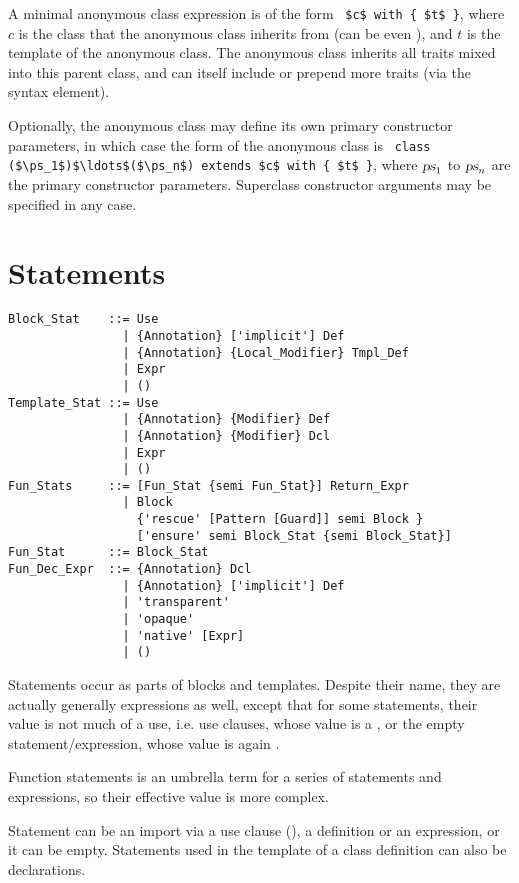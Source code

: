 A minimal anonymous class expression is of the form ~\lstinline!$c$ with { $t$ }!, where $c$ is the class that the anonymous class inherits from (can be even ), and $t$ is the template of the anonymous class. The anonymous class inherits all traits mixed into this parent class, and can itself include or prepend more traits (via the  syntax element). 

Optionally, the anonymous class may define its own primary constructor parameters, in which case the form of the anonymous class is ~\lstinline!class ($\ps_1$)$\ldots$($\ps_n$) extends $c$ with { $t$ }!, where $\mbox{\sl ps}_1$ to $\mbox{\sl ps}_n$ are the primary constructor parameters. Superclass constructor arguments may be specified in any case. 






\section{Statements}

\syntax\begin{lstlisting}
Block_Stat    ::= Use
                | {Annotation} ['implicit'] Def
                | {Annotation} {Local_Modifier} Tmpl_Def
                | Expr
                | ()
Template_Stat ::= Use
                | {Annotation} {Modifier} Def
                | {Annotation} {Modifier} Dcl
                | Expr
                | ()
Fun_Stats     ::= [Fun_Stat {semi Fun_Stat}] Return_Expr
                | Block
                  {'rescue' [Pattern [Guard]] semi Block }
                  ['ensure' semi Block_Stat {semi Block_Stat}]
Fun_Stat      ::= Block_Stat
Fun_Dec_Expr  ::= {Annotation} Dcl
                | {Annotation} ['implicit'] Def
                | 'transparent'
                | 'opaque'
                | 'native' [Expr]
                | ()
\end{lstlisting}

Statements occur as parts of blocks and templates. Despite their name, they are actually generally expressions as well, except that for some statements, their value is not much of a use, i.e. use clauses, whose value is a , or the empty statement/expression, whose value is again . 

Function statements is an umbrella term for a series of statements and expressions, so their effective value is more complex. 

Statement can be an import via a use clause (), a definition or an expression, or it can be empty. Statements used in the template of a class definition can also be declarations. 








